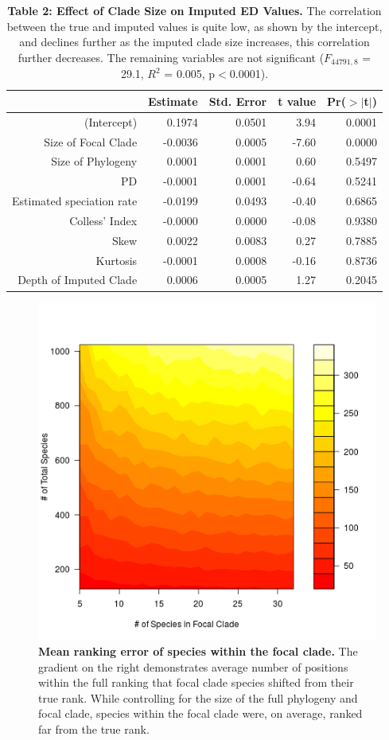 \documentclass[12pt,english]{article}
\begin{document}
\begin{table}[ht] 
\centering
\begin{tabular}{rrrrr}
  \hline
  & Estimate & Std. Error & t value & Pr($>$$|$t$|$) \\
   \hline
   (Intercept) & 0.1974 & 0.0501 & 3.94 & 0.0001 \\
   Size of Focal Clade & -0.0036 & 0.0005 & -7.60 & 0.0000 \\
   Size of Phylogeny & 0.0001 & 0.0001 & 0.60 & 0.5497 \\
   PD & -0.0001 & 0.0001 & -0.64 & 0.5241 \\
   Estimated speciation rate & -0.0199 & 0.0493 & -0.40 & 0.6865 \\
   Colless' Index & -0.0000 & 0.0000 & -0.08 & 0.9380 \\
   Skew & 0.0022 & 0.0083 & 0.27 & 0.7885 \\
   Kurtosis & -0.0001 & 0.0008 & -0.16 & 0.8736 \\
   Depth of Imputed Clade & 0.0006 & 0.0005 & 1.27 & 0.2045 \\
   \hline
   \hline
\end{tabular}
\caption*{\textbf{Table 2: Effect of Clade Size on Imputed ED Values.} The
correlation between the true and imputed values is quite low, as shown by the
intercept, and declines further as the imputed clade size increases, this
correlation further decreases. The remaining variables are not significant
($F_{44791, 8}$ = 29.1, $R^{2}$ = 0.005, p$<$0.0001).}
\end{table}

\begin{figure}[!ht]
  \center
  \includegraphics[width=.5\textwidth]{rankingError.png}
  \caption{\textbf{Mean ranking error of species within the focal clade.} The 
  gradient on the right demonstrates average number of positions within the 
  full ranking that focal clade species shifted from their true rank.
  While controlling for the size of the full phylogeny and focal clade, species 
  within the focal clade were, on average, ranked far from the true rank. }
  \label{rankingError}
\end{figure}
\end{document}
